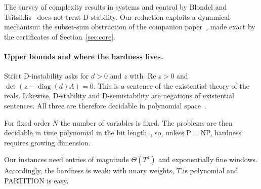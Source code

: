 \documentclass[11pt,a4paper]{article}
\theoremstyle{plain}
\theoremstyle{definition}
\theoremstyle{remark}
\newcommand{\Real}{\operatorname{Re}}
\newcommand{\diag}{\operatorname{diag}}
\begin{document}
The survey of complexity results in systems and control by Blondel and
Tsitsiklis~\cite{blondel2000} does not treat D-stability. Our reduction exploits a
dynamical mechanism: the subset-sum obstruction
of the companion paper~\cite{companion2026}, made exact by the certificates of
Section~\ref{sec:core}.

\paragraph{Upper bounds and where the hardness lives.}
Strict D-instability asks for $d>0$ and $z$ with $\Real z>0$ and $\det(z-\diag(d)A)=0$. This
is a sentence of the existential theory of the reals. Likewise, D-stability and
D-semistability are negations of existential sentences. All three are therefore decidable
in polynomial space~\cite{canny1988,renegar1992a}.

For fixed order $N$ the number of variables is fixed. The problems are then decidable in
time polynomial in the bit length~\cite{renegar1992a,renegar1992b,renegar1992c,basu2006}, so, unless P${}={}$NP,
hardness requires growing dimension.

Our instances need entries of magnitude $\Theta(T^4)$ and exponentially fine windows.
Accordingly, the hardness is weak: with unary weights, $T$ is polynomial and PARTITION is
easy.
\end{document}
